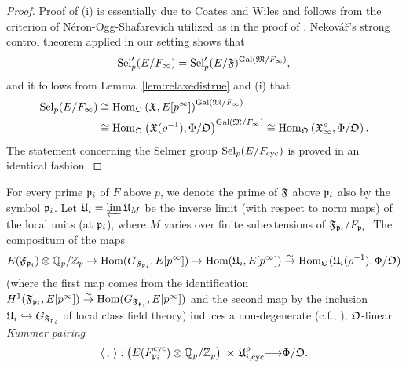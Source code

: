 \documentclass[12pt]{amsart}
\numberwithin{equation}{section}
\begin{document}
\begin{proof}
Proof of (i) is essentially due to Coates and Wiles and follows from the criterion of N\'eron-Ogg-Shafarevich utilized as in the proof of \cite[Theorem 2]{coateswiles77}. Nekov\'a\v{r}'s strong control theorem applied in our setting shows that
$$\textup{Sel}_p^{\prime}(E/F_\infty)=\textup{Sel}_p^{\prime}(E/\frak{F})^{\textup{Gal}(\frak{M}/F_\infty)},$$
and it follows from Lemma~\ref{lem:relaxedistrue} and (i) that
\begin{align*}
\textup{Sel}_p(E/F_\infty)&\cong \textup{Hom}_{\frak{O}}\left(\frak{X},E[p^\infty]\right)^{\textup{Gal}(\frak{M}/F_\infty)}\\
&\cong \textup{Hom}_{\frak{O}}\left(\frak{X}(\rho^{-1}),\Phi/{\frak{O}}\right)^{\textup{Gal}(\frak{M}/F_\infty)}\cong \textup{Hom}_{\frak{O}}\left(\frak{X}^\rho_\infty,\Phi/{\frak{O}}\right).
\end{align*}
The statement concerning the Selmer group $\textup{Sel}_p(E/F_\textup{cyc})$ is proved in an identical fashion.
\end{proof}

For every prime $\frak{p}_i$ of $F$ above $p$, we denote the prime of $\frak{F}$ above $\frak{p}_i$ also by the symbol $\frak{p}_i$. Let $\frak{U}_{i}=\varprojlim \frak{U}_M$ be the inverse limit (with respect to norm maps) of the local units (at $\frak{p}_i$), where $M$ varies over finite subextensions of $\frak{F}_{\frak{p}_i}/F_{\frak{p}_i}$.   The compositum of the maps
\begin{align*} E(\frak{F}_{\frak{p}_i})\otimes{\mathbb{Q}}_p/{\mathbb{Z}}_p\stackrel{}{\rightarrow} \textup{Hom}(G_{\frak{F}_{\frak{p}_i}},E[p^\infty])\stackrel{}{\rightarrow} \textup{Hom}(\frak{U}_i,E[p^\infty])\stackrel{\sim}{\rightarrow}\textup{Hom}_{\frak{O}}(\frak{U}_i(\rho^{-1}),\Phi/{\frak{O}})
\end{align*}
(where the first map comes from the identification $H^1(\frak{F}_{\frak{p}_i},E[p^\infty])\stackrel{\sim}{\rightarrow}\textup{Hom}(G_{\frak{F}_{\frak{p}_i}},E[p^\infty])$ and the second map by the inclusion $\frak{U}_i\hookrightarrow G_{\frak{F}_{\frak{p}_i}}$ of local class field theory) induces a non-degenerate (c.f., \cite[Prop. 5.2]{rubin87}), ${\frak{O}}$-linear \emph{Kummer pairing}
$$\langle\,,\,\rangle: \left(E(F^{\textup{cyc}}_{\frak{p}_i})\otimes{\mathbb{Q}}_p/{\mathbb{Z}}_p\right)\,\,{\times}\,\, \frak{U}_{i,\textup{cyc}}^{\rho}{\longrightarrow} \Phi/{\frak{O}}.$$
\end{document}
